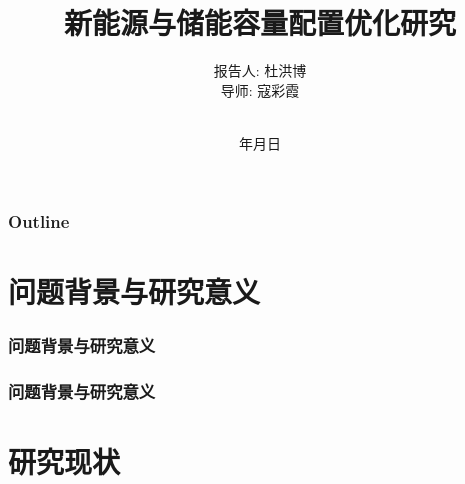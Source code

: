 \documentclass{beamer}
\renewcommand{\today}{\number\year 年\number\month 月\number\day 日}
\begin{document}
\title[新能源与储能容量配置优化研究]%
{新能源与储能容量配置优化研究}

\author[杜洪博]%
{报告人: 杜洪博\\
导\quad 师: 寇彩霞\rule[0pt]{0pt}{20pt}\\}

\institute[BUPT]{\textcolor[rgb]{0.0,0.0,0.10}%
{\small\ttfamily 北京邮电大学\ 理学院\\[10pt]}}

\date{\today}

\begin{frame}[plain]
	\titlepage
\end{frame}

\begin{frame}
	\frametitle{Outline}
	\tableofcontents[hideallsubsections] %
\end{frame}

\AtBeginSection[] %
{ \begin{frame}<beamer> %
		\tableofcontents[currentsection,hideallsubsections]%
	\end{frame}
}





\section{问题背景与研究意义}

\begin{frame}
	\frametitle{问题背景与研究意义} 
	
\end{frame}

\begin{frame}
	\frametitle{问题背景与研究意义} 

\end{frame}

\section{研究现状}
\end{document}
